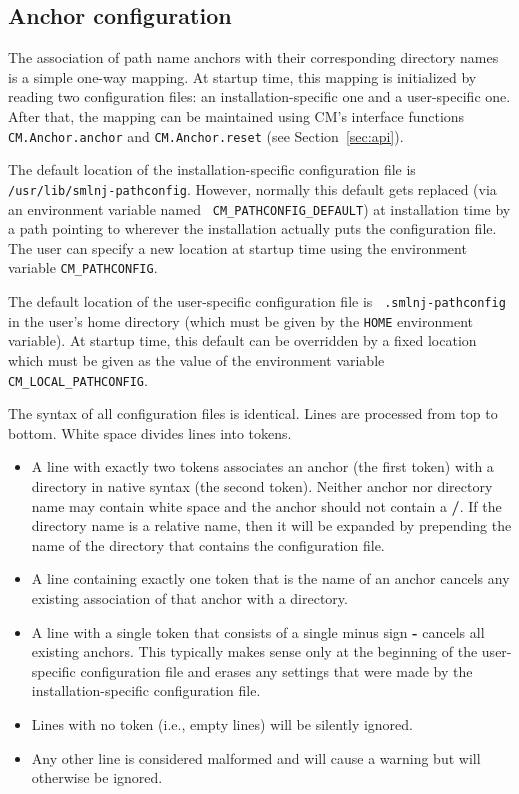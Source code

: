 \documentclass{article}
\begin{document}
\subsection{Anchor configuration}
\label{sec:anchors}

The association of path name anchors with their corresponding
directory names is a simple one-way mapping.  At startup time, this
mapping is initialized by reading two configuration files: an
installation-specific one and a user-specific one.  After that, the
mapping can be maintained using CM's interface functions {\tt
CM.Anchor.anchor} and {\tt CM.Anchor.reset} (see
Section~\ref{sec:api}).

The default location of the installation-specific configuration file
is {\tt /usr/lib/smlnj-pathconfig}.  However, normally this default
gets replaced (via an environment variable named {\tt
CM\_PATHCONFIG\_DEFAULT}) at installation time by a path pointing to
wherever the installation actually puts the configuration file.
The user can specify a new location at startup time using the
environment variable {\tt CM\_PATHCONFIG}.

The default location of the user-specific configuration file is {\tt
.smlnj-pathconfig} in the user's home directory (which must be given
by the {\tt HOME} environment variable).  At startup time, this
default can be overridden by a fixed location which must be given as
the value of the environment variable {\tt CM\_LOCAL\_PATHCONFIG}.

The syntax of all configuration files is identical.  Lines are
processed from top to bottom. White space divides lines into tokens.
\begin{itemize}
\item A line with exactly two tokens associates an anchor (the first
token) with a directory in native syntax (the second token).  Neither
anchor nor directory name may contain white space and the anchor
should not contain a {\bf /}.  If the directory name is a relative
name, then it will be expanded by prepending the name of the directory
that contains the configuration file.
\item A line containing exactly one token that is the name of an
anchor cancels any existing association of that anchor with a
directory.
\item A line with a single token that consists of a single minus sign
{\bf -} cancels all existing anchors.  This typically makes sense only
at the beginning of the user-specific configuration file and
erases any settings that were made by the installation-specific
configuration file.
\item Lines with no token (i.e., empty lines) will be silently ignored.
\item Any other line is considered malformed and will cause a warning
but will otherwise be ignored.
\end{itemize}
\end{document}

